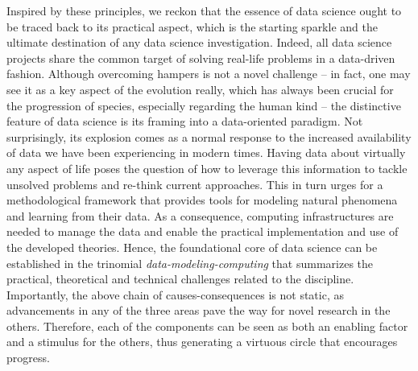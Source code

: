 Inspired by these principles, we reckon that the essence of data science ought to be traced back to its practical aspect, which is the starting sparkle and the ultimate destination of any data science investigation.
Indeed, all data science projects share the common target of solving real-life problems in a data-driven fashion.
Although overcoming hampers is not a novel challenge -- in fact, one may see it as a key aspect of the evolution really, which has always been crucial for the progression of species, especially regarding the human kind -- the distinctive feature of data science is its framing into a data-oriented paradigm.
Not surprisingly, its explosion comes as a normal response to the increased availability of data we have been experiencing in modern times.
Having data about virtually any aspect of life poses the question of how to leverage this information to tackle unsolved problems and re-think current approaches.
This in turn urges for a methodological framework that provides tools for modeling natural phenomena and learning from their data.
As a consequence, computing infrastructures are needed to manage the data and enable the practical implementation and use of the developed theories.
Hence, the foundational core of data science can be established in the trinomial \textit{\mbox{data-modeling-computing}} that summarizes the practical, theoretical and technical challenges related to the discipline.
Importantly, the above chain of causes-consequences is not static, as advancements in any of the three areas pave the way for novel research in the others. 
Therefore, each of the components can be seen as both an enabling factor and a stimulus for the others, thus generating a virtuous circle that encourages progress.

